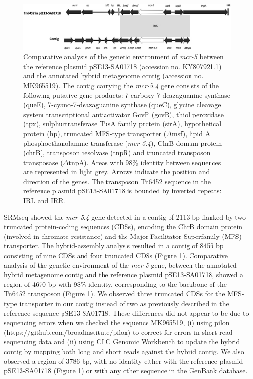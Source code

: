 \begin{figure}[h!]
\centering
\includegraphics[width=\textwidth]{figures/chapter 3/dkz363f1.jpeg}
\caption{Comparative analysis of the genetic environment of \textit{mcr-5} between the reference plasmid pSE13-SA01718 (accession no. KY807921.1) and the annotated hybrid metagenome contig (accession no. MK965519). The contig carrying the \textit{mcr-5.4} gene consists of the following putative gene products: 7-carboxy-7-deazaguanine synthase (queE), 7-cyano-7-deazaguanine synthase (queC), glycine cleavage system transcriptional antiactivator GcvR (gcvR), thiol peroxidase (tpx), sulphurtransferase TusA family protein (sirA), hypothetical protein (hp), truncated MFS-type transporter ($\Delta$msf), lipid A phosphoethanolamine transferase (\textit{mcr-5.4}), ChrB domain protein (chrB), transposon resolvase (tnpR) and truncated transposon transposase ($\Delta$tnpA). Areas with 98\% identity between sequences are represented in light grey. Arrows indicate the position and direction of the genes. The transposon Tn6452 sequence in the reference plasmid pSE13-SA01718 is bounded by inverted repeats: IRL and IRR.}
\label{fig:chap3_figure1}
\end{figure}


SRMseq showed the \textit{mcr-5.4} gene detected in a contig of 2113 bp flanked by two truncated protein-coding sequences (CDSs), encoding the ChrB domain protein (involved in chromate resistance) and the Major Facilitator Superfamily (MFS) transporter.
The hybrid-assembly analysis resulted in a contig of 8456 bp consisting of nine CDSs and four truncated CDSs (Figure \ref{fig:chap3_figure1}).
Comparative analysis of the genetic environment of the \textit{mcr-5} gene, between the annotated hybrid metagenome contig and the reference plasmid pSE13-SA01718, showed a region of 4670 bp with 98\% identity, corresponding to the backbone of the Tn6452 transposon (Figure \ref{fig:chap3_figure1}). 
We observed three truncated CDSs for the MFS-type transporter in our contig instead of two as previously described in the reference sequence pSE13-SA01718. 
These differences did not appear to be due to sequencing errors when we checked the sequence MK965519, (i) using pilon (https://github.com/broadinstitute/pilon) to correct for errors in short-read sequencing data and (ii) using CLC Genomic Workbench to update the hybrid contig by mapping both long and short reads against the hybrid contig.
We also observed a region of 3786 bp, with no identity either with the reference plasmid pSE13-SA01718 (Figure \ref{fig:chap3_figure1}) or with any other sequence in the GenBank database.

